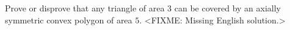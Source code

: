 \problem
Prove or disprove that any triangle of area $3$ can be covered by an axially
symmetric convex polygon of area $5$.
\solution
<FIXME: Missing English solution.>
\endproblem
